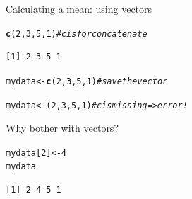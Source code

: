 \documentclass[10pt]{beamer}\usepackage[]{graphicx}\usepackage[]{color}
\makeatletter
\newcommand{\hlnum}[1]{\textcolor[rgb]{0.686,0.059,0.569}{#1}}%
\newcommand{\hlcom}[1]{\textcolor[rgb]{0.678,0.584,0.686}{\textit{#1}}}%
\newcommand{\hlstd}[1]{\textcolor[rgb]{0.345,0.345,0.345}{#1}}%
\newcommand{\hlkwb}[1]{\textcolor[rgb]{0.69,0.353,0.396}{#1}}%
\newcommand{\hlkwd}[1]{\textcolor[rgb]{0.737,0.353,0.396}{\textbf{#1}}}%
\newenvironment{kframe}{%
 \def\at@end@of@kframe{}%
 \ifinner\ifhmode%
  \def\at@end@of@kframe{\end{minipage}}%
  \begin{minipage}{\columnwidth}%
 \fi\fi%
 \def\FrameCommand##1{\hskip\@totalleftmargin \hskip-\fboxsep
 \colorbox{shadecolor}{##1}\hskip-\fboxsep
     \hskip-\linewidth \hskip-\@totalleftmargin \hskip\columnwidth}%
 \MakeFramed {\advance\hsize-\width
   \@totalleftmargin\z@ \linewidth\hsize
   \@setminipage}}%
 {\par\unskip\endMakeFramed%
 \at@end@of@kframe}
\newenvironment{knitrout}{}{} %
\makeatother
\begin{document}
\begin{frame}[fragile]{Calculating a mean: using vectors} %
\begin{knitrout}
\color{fgcolor}\begin{kframe}
\begin{alltt}
\hlkwd{c}\hlstd{(}\hlnum{2}\hlstd{,}\hlnum{3}\hlstd{,}\hlnum{5}\hlstd{,}\hlnum{1}\hlstd{)} \hlcom{# c is for concatenate}
\end{alltt}
\begin{verbatim}
[1] 2 3 5 1
\end{verbatim}
\end{kframe}
\end{knitrout}
  \pause
\begin{knitrout}
\color{fgcolor}\begin{kframe}
\begin{alltt}
\hlstd{mydata} \hlkwb{<-} \hlkwd{c}\hlstd{(}\hlnum{2}\hlstd{,}\hlnum{3}\hlstd{,}\hlnum{5}\hlstd{,}\hlnum{1}\hlstd{)} \hlcom{# save the vector}
\end{alltt}
\end{kframe}
\end{knitrout}
  \pause
  
\begin{knitrout}
\color{fgcolor}\begin{kframe}
\begin{alltt}
 mydata <- (2,3,5,1) \hlcom{# c is missing => error!}
\end{alltt}


{\ttfamily\noindent\bfseries{}}\end{kframe}
\end{knitrout}
  
  \pause
  
  Why bother with vectors?
\begin{knitrout}
\color{fgcolor}\begin{kframe}
\begin{alltt}
  \hlstd{mydata[}\hlnum{2}\hlstd{]} \hlkwb{<-} \hlnum{4}
  \hlstd{mydata}
\end{alltt}
\begin{verbatim}
[1] 2 4 5 1
\end{verbatim}
\end{kframe}
\end{knitrout}
\end{frame}
\end{document}
